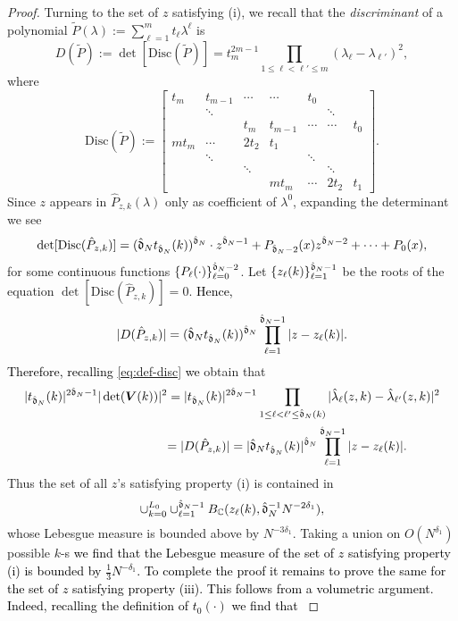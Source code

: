 \documentclass{amsart}
\numberwithin{equation}{section}
\def\corEE{\textcolor{amethyst}}
\def\corEE{}
\def\corAB{}
\def\corABrev{\textcolor{black}}
\begin{document}
\begin{proof}
\corEE{Turning to the set of $z$ satisfying (i),}
we recall that the \textit{discriminant} of
a polynomial
$\tilde{P}(\lambda):=\sum_{\ell=1}^m t_\ell \lambda^\ell$ is
\begin{equation}\label{eq:def-disc}
D(\tilde{P}):= \det[ \mathrm{Disc}(\tilde{P}) ]= t_{m}^{2m-1}\prod_{1 \le \ell <\ell' \le m} (\lambda_\ell - \lambda_{\ell'})^2,
\end{equation}
where
\[
\mathrm{Disc}(\tilde{P}):=\begin{bmatrix} t_m & t_{m-1} & \cdots &\cdots & t_0\\ & \ddots &  & & & \ddots & \\ & & t_m  & t_{m-1} & \cdots & \cdots & t_0  \\ mt_m & \cdots & 2t_2 & t_1 \\ & \ddots & & & \ddots\\ & & \ddots & & & \ddots \\ & & & mt_m & \cdots & 2t_2 & t_1\end{bmatrix}.
\]
Since $z$ appears in $\hat{P}_{z,k}(\lambda)$ only as coefficient of $\lambda^0$, expanding the determinant we see
$$\det[ \mathrm{Disc}(\hat{P}_{z,k})]= (\hat\gd_N t_{\hat\gd_N}(k))^{\hat\gd_N} \cdot z^{\hat\gd_N-1} + P_{\corAB{\hat\gd_N-2}}(x) z^{\hat\gd_N-2}+\cdots +P_0(x),$$
for some continuous functions $\{P_\ell(\cdot)\}_{\ell=0}^{\hat{\mathfrak{d}}_N-2}$. Let $\{z_\ell(k)\}_{\ell=1}^{\hat{\mathfrak{d}}_N-1}$ be the roots of the equation $\det[\mathrm{Disc}(\hat{P}_{z,k})]=0$. 
\corABrev{Hence,
\[
|D(\hat P_{z,k})|= (\hat{\mathfrak{d}}_N t_{\hat{\mathfrak{d}}_N}(k))^{\hat{\mathfrak{d}}_N} \prod_{\ell=1}^{\hat {\mathfrak{d}} _N -1} |z - z_\ell(k)|.
\]
Therefore, recalling \eqref{eq:def-disc} we} obtain that
\[
\corEE{\begin{aligned}
|t_{\hat\gd_N}(k)|^{2\hat\gd_N-1} |\det( {\bm V}(k))|^2
 &= |t_{\hat\gd_N}(k)|^{2\hat\gd_N-1} \prod_{1 \le \ell < \ell' \le \hat\gd_N(k)} |\hat{\lambda}_\ell(z,k) - \hat{\lambda}_{\ell'}(z,k)|^2 \\
 &\corABrev{= |D(\hat P_{z,k})|}= |\hat\gd_N t_{\hat\gd_N}(k)|^{\hat\gd_N} \prod_{\ell=1}^{\hat\gd_N-1} |z- z_\ell(k)|.
 \end{aligned}}
\]
Thus the set of all $z$'s satisfying property (i) is contained in
\[
\cup_{k=0}^{L_0} \cup_{\ell=1}^{\hat{\mathfrak{d}}_N-1} B_{\mathbb{C}}(z_\ell(k), \hat{\mathfrak{d}}_N^{-1} N^{-2\delta_1}),
\]
whose Lebesgue measure is bounded above by
$N^{-3\delta_1}$. Taking a union on $O(N^{\delta_1})$ possible $k$-s
\corABrev{we find that the Lebesgue measure of the set of $z$ satisfying property (i) is bounded by $\frac13 N^{-\delta_1}$. To complete the proof it remains to prove the same for the set of $z$ satisfying property (iii). This follows from a volumetric argument. Indeed, recalling the definition of $t_0(\cdot)$ we find that
}
\end{proof}
\end{document}
